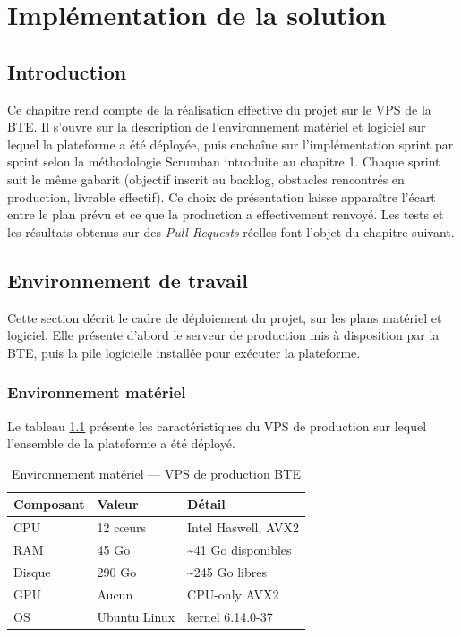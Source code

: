 \chapter{Implémentation de la solution}

\section*{Introduction}

Ce chapitre rend compte de la réalisation effective du projet sur le VPS de la BTE.
Il s'ouvre sur la description de l'environnement matériel et logiciel sur lequel la
plateforme a été déployée, puis enchaîne sur l'implémentation sprint par sprint
selon la méthodologie Scrumban introduite au chapitre 1. Chaque sprint suit le même
gabarit (objectif inscrit au backlog, obstacles rencontrés en production, livrable
effectif). Ce choix de présentation laisse apparaître l'écart entre le plan prévu
et ce que la production a effectivement renvoyé. Les tests et les résultats obtenus
sur des \textit{Pull Requests} réelles font l'objet du chapitre suivant.

\section{Environnement de travail}

    Cette section décrit le cadre de déploiement du projet, sur les plans matériel et
    logiciel. Elle présente d'abord le serveur de production mis à disposition par la BTE,
    puis la pile logicielle installée pour exécuter la plateforme.

    \subsection{Environnement matériel}

        Le tableau \ref{tab:vps_env} présente les caractéristiques du VPS de production
        sur lequel l'ensemble de la plateforme a été déployé.

        \begin{table}[H]
        \centering
        \begin{tabular}{|m{3cm}|m{3cm}|m{6cm}|}
        \hline
        \textbf{Composant} & \textbf{Valeur} & \textbf{Détail} \\
        \hline
        CPU & 12 cœurs & Intel Haswell, AVX2 \\
        \hline
        RAM & 45 Go & \textasciitilde41 Go disponibles \\
        \hline
        Disque & 290 Go & \textasciitilde245 Go libres \\
        \hline
        GPU & Aucun & CPU-only AVX2 \\
        \hline
        OS & Ubuntu Linux & kernel 6.14.0-37 \\
        \hline
        \end{tabular}
        \caption{Environnement matériel — VPS de production BTE}
        \label{tab:vps_env}
        \end{table}


